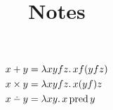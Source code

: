 \appendix

\title{Notes}

\begin{align*}
x + y & = \lambdabstract{xyfz}{x f (y f z)} \\
x \times y & = \lambdabstract{xyfz}{x (y f) z} \\
x \dotminus y & = \lambdabstract{xy}{x \operatorname{pred} y} \\
\end{align*}

